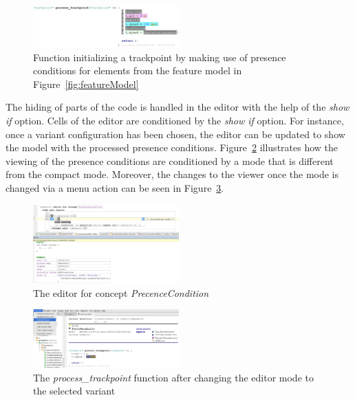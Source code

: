 \documentclass[preprint,numbers,10pt]{sigplanconf}
\begin{document}
\begin{figure}[H]
	\centering
	\includegraphics[width=0.50\textwidth]{screens/process_trackpoint.png}
	\caption{Function initializing a trackpoint by making use of presence conditions for elements from the
feature model in Figure~\ref{fig:featureModel}}
	\label{fig:presenceCond}
\end{figure}

The hiding of parts of the code is handled in the editor with the help of the \emph{show if} option.
Cells of the editor are conditioned by the \emph{show if} option. For instance, once a variant configuration has been chosen,
the editor can be updated to show the model with the processed presence conditions. Figure~\ref{fig:presenceConditionEditor}
illustrates how the viewing of the presence conditions are conditioned by a mode that is different from the compact mode.
Moreover, the changes to the viewer once the mode is changed via a menu action can be seen in Figure~\ref{fig:processTrackpointSelectedVariant}.

\begin{figure}[H]
	\centering
	\includegraphics[width=0.50\textwidth]{screens/PresenceConditionEditor.png}
	\caption{The editor for concept \emph{PrecenceCondition}}
	\label{fig:presenceConditionEditor}
\end{figure}

\begin{figure}[H]
	\centering
	\includegraphics[width=0.50\textwidth]{screens/ProcessTrackpointSelectedVariant.png}
	\caption{The \emph{process\_trackpoint} function after changing the editor mode to the selected
variant}
	\label{fig:processTrackpointSelectedVariant}
\end{figure}
\end{document}
